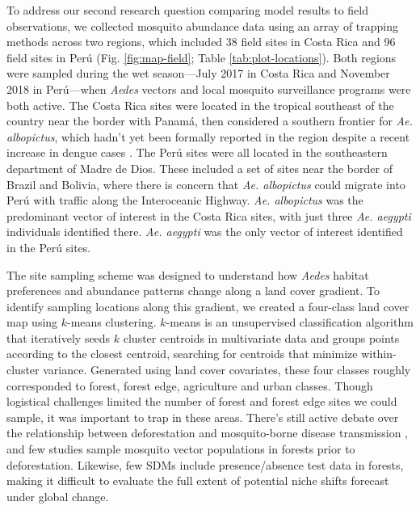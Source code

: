 To address our second research question comparing model results to field observations, we collected mosquito abundance data using an array of trapping methods across two regions, which included 38 field sites in Costa Rica and 96 field sites in Perú (Fig. \ref{fig:map-field}; Table \ref{tab:plot-locations}). Both regions were sampled during the wet season—July 2017 in Costa Rica and November 2018 in Perú—when \textit{Aedes} vectors and local mosquito surveillance programs were both active. The Costa Rica sites were located in the tropical southeast of the country near the border with Panamá, then considered a southern frontier for \textit{Ae. albopictus}, which hadn’t yet been formally reported in the region despite a recent increase in dengue cases \cite{Gutierrez2015-hx}. The Perú sites were all located in the southeastern department of Madre de Dios. These included a set of sites near the border of Brazil and Bolivia, where there is concern that \textit{Ae. albopictus} could migrate into Perú with traffic along the Interoceanic Highway. \textit{Ae. albopictus} was the predominant vector of interest in the Costa Rica sites, with just three \textit{Ae. aegypti} individuals identified there. \textit{Ae. aegypti} was the only vector of interest identified in the Perú sites.

The site sampling scheme was designed to understand how \textit{Aedes} habitat preferences and abundance patterns change along a land cover gradient. To identify sampling locations along this gradient, we created a four-class land cover map using $k$-means clustering. $k$-means is an unsupervised classification algorithm that iteratively seeds $k$ cluster centroids in multivariate data and groups points according to the closest centroid, searching for centroids that minimize within-cluster variance. Generated using land cover covariates, these four classes roughly corresponded to forest, forest edge, agriculture and urban classes. Though logistical challenges limited the number of forest and forest edge sites we could sample, it was important to trap in these areas. There’s still active debate over the relationship between deforestation and mosquito-borne disease transmission \cite{Norris2004-jr, Tucker_Lima2017-fd}, and few studies sample mosquito vector populations in forests prior to deforestation. Likewise, few SDMs include presence/absence test data in forests, making it difficult to evaluate the full extent of potential niche shifts forecast under global change.

